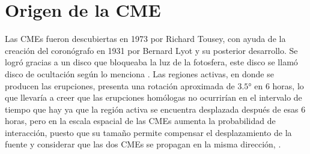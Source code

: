 \section{Origen de la CME}

Las \acp{CME} fueron descubiertas en 1973 por Richard Tousey, con ayuda de la creación del coronógrafo en 1931 por Bernard Lyot y su posterior desarrollo. Se logró gracias a un disco que bloqueaba la luz de la fotosfera, este disco se llamó disco de ocultación según lo menciona \cite[e.g.][]{2014swcm.book.....H}.
Las regiones activas, en donde se producen las erupciones, presenta una rotación aproximada de $3.5°$ en 6 horas, lo que llevaría a creer que las erupciones homólogas no ocurrirían en el intervalo de tiempo que hay ya que la región activa se encuentra desplazada después de esas 6 horas, pero en la escala espacial de las \acp{CME} aumenta la probabilidad de interacción, puesto que su tamaño permite compensar el desplazamiento de la fuente y considerar que las dos \acp{CME} se propagan en la misma dirección, \cite{lugaz-2005}.

